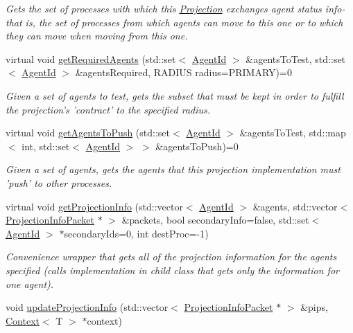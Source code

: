 \begin{DoxyCompactItemize}
\begin{DoxyCompactList}\small\item\em Gets the set of processes with which this \hyperlink{classrepast_1_1_projection}{Projection} exchanges agent status info-\/ that is, the set of processes from which agents can move to this one or to which they can move when moving from this one. \end{DoxyCompactList}\item 
virtual void \hyperlink{classrepast_1_1_projection_ad13ded8db8e364aa43efde5b35da9a65}{get\-Required\-Agents} (std\-::set$<$ \hyperlink{classrepast_1_1_agent_id}{Agent\-Id} $>$ \&agents\-To\-Test, std\-::set$<$ \hyperlink{classrepast_1_1_agent_id}{Agent\-Id} $>$ \&agents\-Required, R\-A\-D\-I\-U\-S radius=P\-R\-I\-M\-A\-R\-Y)=0
\begin{DoxyCompactList}\small\item\em Given a set of agents to test, gets the subset that must be kept in order to fulfill the projection's 'contract' to the specified radius. \end{DoxyCompactList}\item 
virtual void \hyperlink{classrepast_1_1_projection_ae1877809facd80a5e25d95e3dc5c35f4}{get\-Agents\-To\-Push} (std\-::set$<$ \hyperlink{classrepast_1_1_agent_id}{Agent\-Id} $>$ \&agents\-To\-Test, std\-::map$<$ int, std\-::set$<$ \hyperlink{classrepast_1_1_agent_id}{Agent\-Id} $>$ $>$ \&agents\-To\-Push)=0
\begin{DoxyCompactList}\small\item\em Given a set of agents, gets the agents that this projection implementation must 'push' to other processes. \end{DoxyCompactList}\item 
\hypertarget{classrepast_1_1_projection_ae66e268656f0baee2a7656d5eda6f4b9}{virtual void \hyperlink{classrepast_1_1_projection_ae66e268656f0baee2a7656d5eda6f4b9}{get\-Projection\-Info} (std\-::vector$<$ \hyperlink{classrepast_1_1_agent_id}{Agent\-Id} $>$ \&agents, std\-::vector$<$ \hyperlink{classrepast_1_1_projection_info_packet}{Projection\-Info\-Packet} $\ast$ $>$ \&packets, bool secondary\-Info=false, std\-::set$<$ \hyperlink{classrepast_1_1_agent_id}{Agent\-Id} $>$ $\ast$secondary\-Ids=0, int dest\-Proc=-\/1)}\label{classrepast_1_1_projection_ae66e268656f0baee2a7656d5eda6f4b9}

\begin{DoxyCompactList}\small\item\em Convenience wrapper that gets all of the projection information for the agents specified (calls implementation in child class that gets only the information for one agent). \end{DoxyCompactList}\item 
\hypertarget{classrepast_1_1_projection_ae89c14a3463d292ba1cd829204fbee71}{void \hyperlink{classrepast_1_1_projection_ae89c14a3463d292ba1cd829204fbee71}{update\-Projection\-Info} (std\-::vector$<$ \hyperlink{classrepast_1_1_projection_info_packet}{Projection\-Info\-Packet} $\ast$ $>$ \&pips, \hyperlink{classrepast_1_1_context}{Context}$<$ T $>$ $\ast$context)}\label{classrepast_1_1_projection_ae89c14a3463d292ba1cd829204fbee71}


\end{DoxyCompactItemize}
